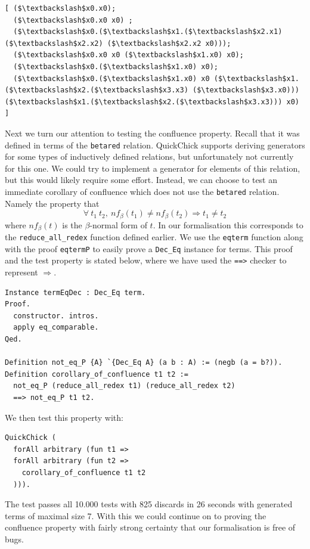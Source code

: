 \documentclass[twoside,11pt,openright]{report}
\newenvironment{code}{\captionsetup{type=figure, singlelinecheck=off, justification=raggedleft}}{}
\newcommand{\coq}[1]{\texttt{#1}}
\begin{document}
\begin{code}
\begin{verbatim}
[ ($\textbackslash$x0.x0); 
  ($\textbackslash$x0.x0 x0) ;
  ($\textbackslash$x0.($\textbackslash$x1.($\textbackslash$x2.x1) ($\textbackslash$x2.x2) ($\textbackslash$x2.x2 x0))); 
  ($\textbackslash$x0.x0 x0 ($\textbackslash$x1.x0) x0); 
  ($\textbackslash$x0.($\textbackslash$x1.x0) x0); 
  ($\textbackslash$x0.($\textbackslash$x1.x0) x0 ($\textbackslash$x1.($\textbackslash$x2.($\textbackslash$x3.x3) ($\textbackslash$x3.x0))) ($\textbackslash$x1.($\textbackslash$x2.($\textbackslash$x3.x3))) x0) ]
\end{verbatim}
\end{code}
Next we turn our attention to testing the confluence property. Recall that it was defined in terms of the \coq{betared} relation. QuickChick supports deriving generators for some types of inductively defined relations, but unfortunately not currently for this one. We could try to implement a generator for elements of this relation, but this would likely require some effort. Instead, we can choose to test an immediate corollary of confluence which does not use the \coq{betared} relation. Namely the property that $$\forall \ t_1 \ t_2, \ nf_{\beta}(t_1) \neq nf_{\beta}(t_2) \Rightarrow t_1 \neq t_2$$
where $nf_\beta(t)$ is the $\beta$-normal form of $t$. In our formalisation this corresponds to the \coq{reduce\_all\_redex} function defined earlier. We use the \coq{eqterm} function along with the proof \coq{eqtermP} to easily prove a \coq{Dec\_Eq} instance for terms. This proof and the test property is stated below, where we have used the \coq{==>} checker to represent $\Rightarrow$.
\begin{code}
\begin{verbatim}
Instance termEqDec : Dec_Eq term.
Proof. 
  constructor. intros. 
  apply eq_comparable.
Qed.

Definition not_eq_P {A} `{Dec_Eq A} (a b : A) := (negb (a = b?)).
Definition corollary_of_confluence t1 t2 := 
  not_eq_P (reduce_all_redex t1) (reduce_all_redex t2) 
  ==> not_eq_P t1 t2.
\end{verbatim}
\end{code}
We then test this property with:
\begin{code}
\begin{verbatim}
QuickChick (
  forAll arbitrary (fun t1 =>
  forAll arbitrary (fun t2 =>
    corollary_of_confluence t1 t2
  ))).
\end{verbatim}
\end{code}
The test passes all 10.000 tests with 825 discards in 26 seconds with generated terms of maximal size 7. With this we could continue on to proving the confluence property with fairly strong certainty that our formalisation is free of bugs. 
\end{document}
